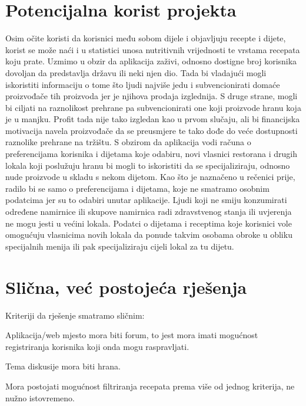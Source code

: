 	\section{Potencijalna korist projekta}
	Osim očite koristi da korisnici među sobom dijele i objavljuju recepte i dijete, korist se može naći i u statistici unosa nutritivnih vrijednosti te vrstama recepata koju prate. Uzmimo u obzir da aplikacija \glqq zaživi\grqq, odnosno dostigne broj korisnika dovoljan da predstavlja državu ili neki njen dio. Tada bi vladajući mogli iskoristiti informaciju o tome što ljudi najviše jedu i subvencionirati domaće proizvođače tih proizvoda jer je njihova prodaja izglednija. S druge strane, mogli bi ciljati na raznolikost prehrane pa subvencionirati one koji proizvode hranu koja je u manjku. Profit tada nije tako izgledan kao u prvom slučaju, ali bi financijska motivacija navela proizvođače da se preusmjere te tako dođe do veće dostupnosti raznolike prehrane na tržištu. S obzirom da aplikacija vodi računa o preferencijama korisnika i dijetama koje odabiru, novi vlasnici restorana i drugih lokala koji poslužuju hranu bi mogli to iskoristiti da se specijaliziraju, odnosno nude proizvode u skladu s nekom dijetom. Kao što je naznačeno u rečenici prije, radilo bi se samo o preferencijama i dijetama, koje ne smatramo osobnim podatcima jer su to odabiri unutar aplikacije. Ljudi koji ne smiju konzumirati određene namirnice ili skupove namirnica radi zdravstvenog stanja ili uvjerenja ne mogu jesti u većini lokala. Podatci o dijetama i receptima koje korisnici vole omogućuju vlasnicima novih lokala da ponude takvim osobama obroke u obliku specijalnih menija ili pak specijaliziraju cijeli lokal za tu dijetu.

	\section{Slična, već postojeća rješenja}
	Kriteriji da rješenje smatramo sličnim:
	\begin{packed_item}
		\item Aplikacija/web mjesto mora biti forum, to jest mora imati mogućnost registriranja korisnika koji onda mogu raspravljati.
		\item Tema diskusije mora biti hrana.
		\item Mora postojati mogućnost filtriranja recepata prema više od jednog kriterija, ne nužno istovremeno.
	\end{packed_item}

